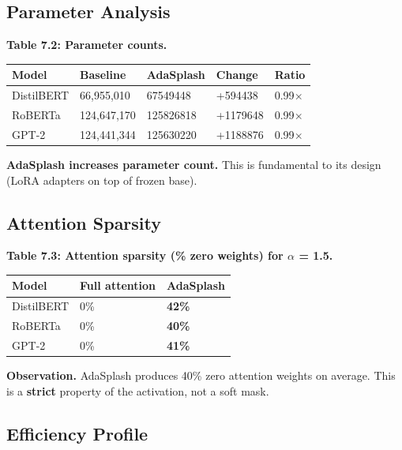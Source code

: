 \subsection{Parameter Analysis}

\textbf{Table 7.2: Parameter counts.}

\begin{table}[H]
\centering
\small
\begin{tabular}{lllll}
\toprule
\textbf{Model} & \textbf{Baseline} & \textbf{AdaSplash} & \textbf{Change} & \textbf{Ratio} \\
\midrule
DistilBERT & 66,955,010 & 67549448 & +594438 & 0.99$\times$ \\
RoBERTa & 124,647,170 & 125826818 & +1179648 & 0.99$\times$ \\
GPT-2 & 124,441,344 & 125630220 & +1188876 & 0.99$\times$ \\
\bottomrule
\end{tabular}
\end{table}

\textbf{AdaSplash increases parameter count.} This is fundamental to its design 
(LoRA adapters on top of frozen base).

\subsection{Attention Sparsity}

\textbf{Table 7.3: Attention sparsity (\% zero weights) for $\alpha$ = 1.5.}

\begin{table}[H]
\centering
\small
\begin{tabular}{lll}
\toprule
\textbf{Model} & \textbf{Full attention} & \textbf{AdaSplash} \\
\midrule
DistilBERT & 0\% & \textbf{42\%} \\
RoBERTa & 0\% & \textbf{40\%} \\
GPT-2 & 0\% & \textbf{41\%} \\
\bottomrule
\end{tabular}
\end{table}

\textbf{Observation.} AdaSplash produces 40\% zero attention weights 
on average. This is a \textbf{strict} property of the activation, not a soft mask.

\subsection{Efficiency Profile}


